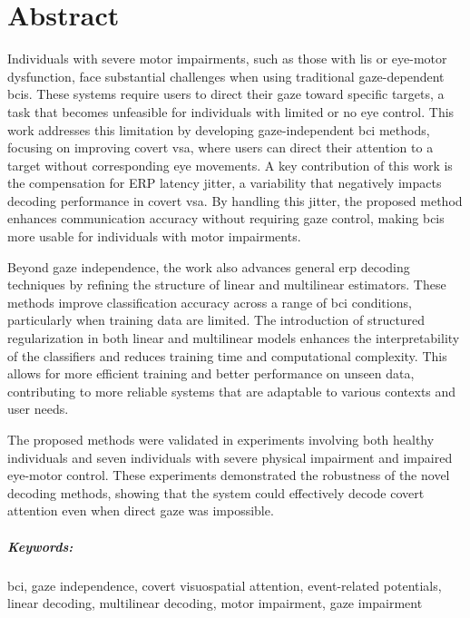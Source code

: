 \chapter*{Abstract}

Individuals with severe motor impairments, such as those with \ac{lis}
or eye-motor dysfunction, face substantial challenges when using traditional
gaze-dependent \acp{bci}.
These systems require users to direct their gaze toward specific targets, a
task that becomes unfeasible for individuals with limited or no eye control.
This work addresses this limitation by developing gaze-independent
\ac{bci} methods, focusing on improving covert \ac{vsa}, where users can direct
their attention to a target without corresponding eye movements.
A key contribution of this work is the compensation for ERP latency jitter, a
variability that negatively impacts decoding performance in covert \ac{vsa}.
By handling this jitter, the proposed method enhances communication accuracy
without requiring gaze control, making \acp{bci} more usable for individuals with
motor impairments.

Beyond gaze independence, the work also advances general \ac{erp} decoding
techniques by refining the structure of linear and multilinear estimators.
These methods improve classification accuracy across a range of \ac{bci}
conditions, particularly when training data are limited.
The introduction of structured regularization in both linear and multilinear
models enhances the interpretability of the classifiers and reduces training
time and computational complexity.
This allows for more efficient training and better performance on unseen data,
contributing to more reliable systems that are adaptable to various contexts and user needs.

The proposed methods were validated in experiments involving both healthy
individuals and seven individuals with severe physical impairment and impaired eye-motor control.
These experiments demonstrated the robustness of the novel decoding methods,
showing that the system could effectively decode covert attention even when
direct gaze was impossible.

\paragraph{Keywords:} \acl{bci}, gaze independence, covert
visuospatial attention, event-related potentials, linear decoding, multilinear
decoding, motor impairment, gaze impairment
